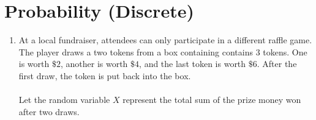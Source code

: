 \documentclass[10pt]{article}
\begin{document}
\section{Probability (Discrete)}
\begin{enumerate}
\item At a local fundraiser, attendees can only participate in a different raffle game. The player draws a two tokens from a box containing contains $3$ tokens. One is worth $\$2$, another is worth $\$4$, and the last token is worth $\$6$. After the first draw, the token is put back into the box.\\\\
Let the random variable $X$ represent the total sum of the prize money won after two draws.

\end{enumerate}
\end{document}
